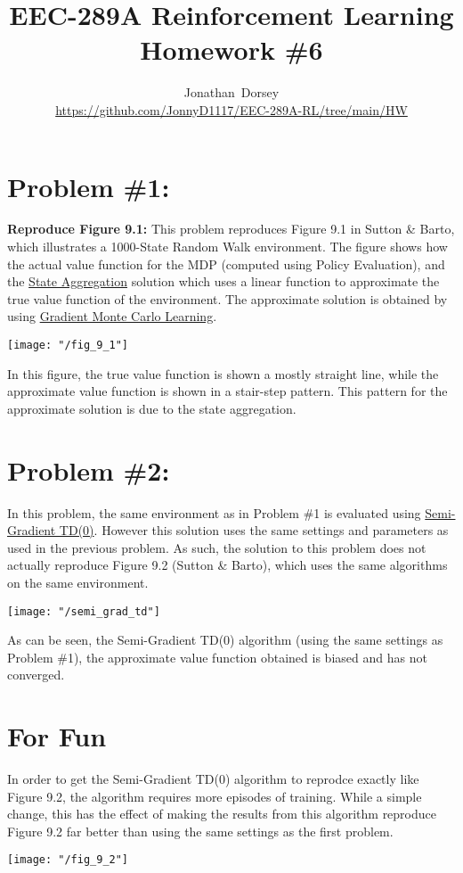 \documentclass[12pt]{article}
\begin{document}
\title{ EEC-289A Reinforcement Learning \\ Homework \#6 }


\author{Jonathan~Dorsey \\\url{https://github.com/JonnyD1117/EEC-289A-RL/tree/main/HW}}
\maketitle

\section*{Problem \#1: }

\textbf{Reproduce Figure 9.1:} This problem reproduces Figure 9.1 in Sutton \& Barto, which illustrates a 1000-State Random Walk environment. The figure shows how the actual value function for the MDP (computed using Policy Evaluation), and the \underline{State Aggregation} solution which uses a linear function to approximate the true value function of the environment. The approximate solution is obtained by using \underline{Gradient Monte Carlo Learning}.

\texttt{[image: "/fig\_9\_1"]}

\noindent In this figure, the true value function is shown a mostly straight line, while the approximate value function is shown in a stair-step pattern. This pattern for the approximate solution is due to the state aggregation.




\section*{Problem \#2: }

In this problem, the same environment as in Problem \#1 is evaluated using \underline{Semi-Gradient TD(0)}. However this solution uses the same settings and parameters as used in the previous problem. As such, the solution to this problem does not actually reproduce Figure 9.2 (Sutton \& Barto), which uses the same algorithms on the same environment.

\texttt{[image: "/semi\_grad\_td"]}

\noindent As can be seen, the Semi-Gradient TD(0) algorithm (using the same settings as Problem \#1), the approximate value function obtained is biased and has not converged.

\section*{For Fun}

In order to get the Semi-Gradient TD(0) algorithm to reprodce exactly like Figure 9.2, the algorithm requires more episodes of training. While a simple change, this has the effect of making the results from this algorithm reproduce Figure 9.2 far better than using the same settings as the first problem.

\texttt{[image: "/fig\_9\_2"]}
\end{document}
